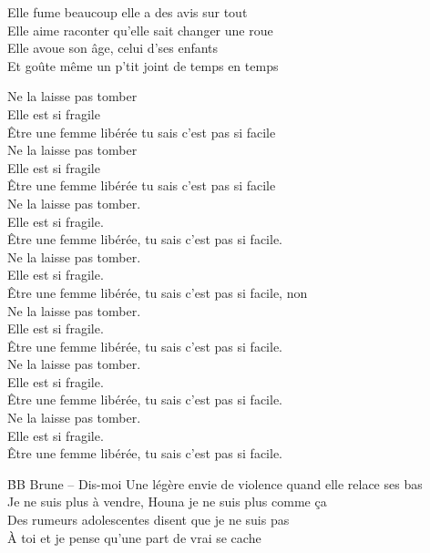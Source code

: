 \documentclass{novel}
\begin{document}
\begin{multicols}{2}
Elle fume beaucoup elle a des avis sur tout \\
Elle aime raconter qu'elle sait changer une roue \\
Elle avoue son âge, celui d'ses enfants \\
Et goûte même un p'tit joint de temps en temps

Ne la laisse pas tomber \\
Elle est si fragile \\
Être une femme libérée tu sais c'est pas si facile \\
Ne la laisse pas tomber \\
Elle est si fragile \\
Être une femme libérée tu sais c'est pas si facile \\

Ne la laisse pas tomber. \\
Elle est si fragile. \\
Être une femme libérée, tu sais c'est pas si facile. \\
Ne la laisse pas tomber. \\
Elle est si fragile. \\
Être une femme libérée, tu sais c'est pas si facile, non \\

Ne la laisse pas tomber. \\
Elle est si fragile. \\
Être une femme libérée, tu sais c'est pas si facile. \\
Ne la laisse pas tomber. \\
Elle est si fragile. \\
Être une femme libérée, tu sais c'est pas si facile. \\
Ne la laisse pas tomber. \\
Elle est si fragile. \\
Être une femme libérée, tu sais c'est pas si facile. \\
\end{multicols}



\newpage
\normalsize
\h*{BB Brune – Dis-moi}
Une légère envie de violence quand elle relace ses bas \\
Je ne suis plus à vendre, Houna je ne suis plus comme ça \\
Des rumeurs adolescentes disent que je ne suis pas \\
À toi et je pense qu'une part de vrai se cache \\
\end{document}
